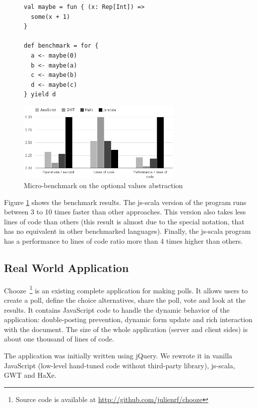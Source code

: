 \documentclass[preprint]{sigplanconf}
\begin{document}
\begin{figure}
\begin{lstlisting}[label=lst:option-benchmark,caption=Micro-benchmark code for the optional values
abstraction]
val maybe = fun { (x: Rep[Int]) =>
  some(x + 1)
}

def benchmark = for {
  a <- maybe(0)
  b <- maybe(a)
  c <- maybe(b)
  d <- maybe(c)
} yield d
\end{lstlisting}
\end{figure}


\begin{figure}
\centering
\includegraphics[width=8cm]{microbenchmark.png}
\caption{Micro-benchmark on the optional values abstraction}
\label{micro-benchmark}
\end{figure}

Figure \ref{micro-benchmark} shows the benchmark results. The js-scala version of the program runs
between 3 to 10 times faster than other approaches. This version also takes less lines of code than
others (this result is almost due to the special  notation, that has no equivalent in
other benchmarked languages). Finally, the js-scala program has a performance to lines of code ratio
more than 4 times higher than others.

\subsection{Real World Application}

Chooze~\footnote{Source code is available at
\href{http://github.com/julienrf/chooze}{http://github.com/julienrf/chooze}} is an existing
complete application for making polls. It allows users to create a poll, define the choice
alternatives, share the poll, vote and look at the results. It contains JavaScript code to handle
the dynamic behavior of the application: double-posting prevention, dynamic form update and rich
interaction with the document. The size of the whole application (server and client sides) is about one thousand of lines of code.

The application was initially written using jQuery. We rewrote it in vanilla JavaScript (low-level
hand-tuned code without third-party library), js-scala, GWT and HaXe.
\end{document}
